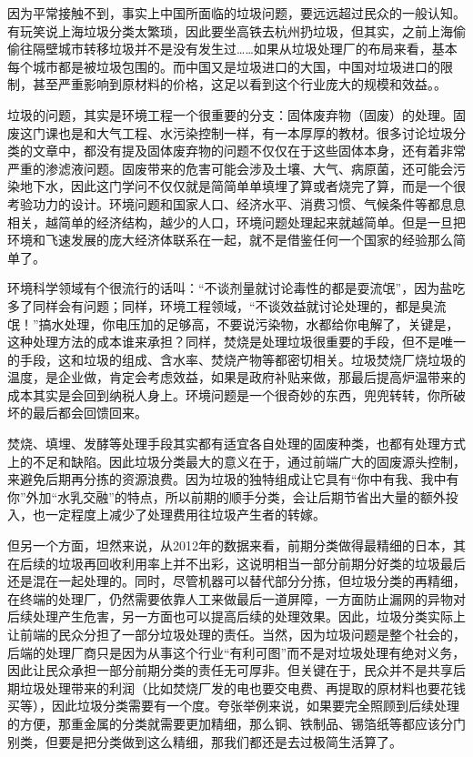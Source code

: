 \documentclass[]{book}
\begin{document}
因为平常接触不到，事实上中国所面临的垃圾问题，要远远超过民众的一般认知。有玩笑说上海垃圾分类太繁琐，因此要坐高铁去杭州扔垃圾，但其实，之前上海偷偷往隔壁城市转移垃圾并不是没有发生过\ldots{}\ldots{}如果从垃圾处理厂的布局来看，基本每个城市都是被垃圾包围的。而中国又是垃圾进口的大国，中国对垃圾进口的限制，甚至严重影响到原材料的价格，这足以看到这个行业庞大的规模和效益。。

垃圾的问题，其实是环境工程一个很重要的分支：固体废弃物（固废）的处理。固废这门课也是和大气工程、水污染控制一样，有一本厚厚的教材。很多讨论垃圾分类的文章中，都没有提及固体废弃物的问题不仅仅在于这些固体本身，还有着非常严重的渗滤液问题。固废带来的危害可能会涉及土壤、大气、病原菌，还可能会污染地下水，因此这门学问不仅仅就是简简单单填埋了算或者烧完了算，而是一个很考验功力的设计。环境问题和国家人口、经济水平、消费习惯、气候条件等都息息相关，越简单的经济结构，越少的人口，环境问题处理起来就越简单。但是一旦把环境和飞速发展的庞大经济体联系在一起，就不是借鉴任何一个国家的经验那么简单了。

环境科学领域有个很流行的话叫：``不谈剂量就讨论毒性的都是耍流氓''，因为盐吃多了同样会有问题；同样，环境工程领域，``不谈效益就讨论处理的，都是臭流氓！''搞水处理，你电压加的足够高，不要说污染物，水都给你电解了，关键是，这种处理方法的成本谁来承担？同样，焚烧是处理垃圾很重要的手段，但不是唯一的手段，这和垃圾的组成、含水率、焚烧产物等都密切相关。垃圾焚烧厂烧垃圾的温度，是企业做，肯定会考虑效益，如果是政府补贴来做，那最后提高炉温带来的成本其实是会回到纳税人身上。环境问题是一个很奇妙的东西，兜兜转转，你所破坏的最后都会回馈回来。

焚烧、填埋、发酵等处理手段其实都有适宜各自处理的固废种类，也都有处理方式上的不足和缺陷。因此垃圾分类最大的意义在于，通过前端广大的固废源头控制，来避免后期再分拣的资源浪费。因为垃圾的独特组成让它具有``你中有我、我中有你''外加``水乳交融''的特点，所以前期的顺手分类，会让后期节省出大量的额外投入，也一定程度上减少了处理费用往垃圾产生者的转嫁。

但另一个方面，坦然来说，从2012年的数据来看，前期分类做得最精细的日本，其在后续的垃圾再回收利用率上并不出彩，这说明相当一部分前期分好类的垃圾最后还是混在一起处理的。同时，尽管机器可以替代部分分拣，但垃圾分类的再精细，在终端的处理厂，仍然需要依靠人工来做最后一道屏障，一方面防止漏网的异物对后续处理产生危害，另一方面也可以提高后续的处理效果。因此，垃圾分类实际上让前端的民众分担了一部分垃圾处理的责任。当然，因为垃圾问题是整个社会的，后端的处理厂商只是因为从事这个行业``有利可图''而不是对垃圾处理有绝对义务，因此让民众承担一部分前期分类的责任无可厚非。但关键在于，民众并不是共享后期垃圾处理带来的利润（比如焚烧厂发的电也要交电费、再提取的原材料也要花钱买等），因此垃圾分类需要有一个度。夸张举例来说，如果要完全照顾到后续处理的方便，那重金属的分类就需要更加精细，那么铜、铁制品、锡箔纸等都应该分门别类，但要是把分类做到这么精细，那我们都还是去过极简生活算了。
\end{document}
